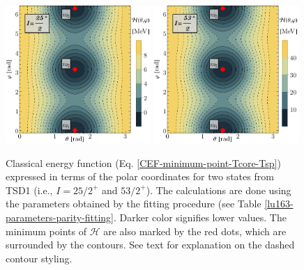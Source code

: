 \begin{figure}
    \centering
    \includegraphics[width=0.49\textwidth]{Chapters/Figures/parity-partners-plots/contour-tsd1-1.pdf}
    \includegraphics[width=0.49\textwidth]{Chapters/Figures/parity-partners-plots/contour-tsd1-2.pdf}
    \caption{Classical energy function (Eq. \ref{CEF-minimum-point-Tcore-Tsp}) expressed in terms of the polar coordinates for two states from TSD1 (i.e., $I=25/2^+$ and $53/2^+$). The calculations are done using the parameters obtained by the fitting procedure (see Table \ref{lu163-parameters-parity-fitting}. Darker color signifies lower values. The minimum points of $\mathcal{H}$ are also marked by the red dots, which are surrounded by the contours. See text for explanation on the dashed contour styling.}
    \label{contour-cef-polar-tsd1}
\end{figure}
